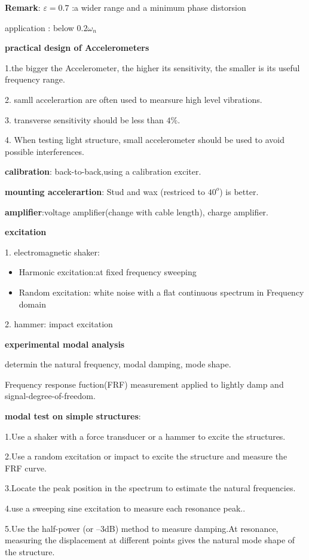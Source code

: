 \documentclass{article}
\begin{document}
\begin{multicols*}{3}
\textbf{Remark}:
$\varepsilon=0.7$ :a wider range and a minimum phase distorsion

application : below $0.2\omega_{n}$

\textbf{practical design of Accelerometers}

1.the bigger the Accelerometer, the higher its sensitivity, the smaller is its useful frequency range.

2. samll accelerartion are often used to mearsure high level vibrations.

3. transverse sensitivity should be less than $4\%$.

4. When testing light structure, small accelerometer should be used to avoid possible interferences.

\textbf{calibration}: back-to-back,using a calibration exciter.

\textbf{mounting accelerartion}: Stud and wax (restriced to $40^{o}$) is better.

\textbf{amplifier}:voltage amplifier(change with cable length), charge amplifier.

\textbf{excitation}

1. electromagnetic shaker:
\begin{itemize}
  \item Harmonic excitation:at fixed frequency sweeping
  \item Random excitation: white noise with  a flat continuous spectrum in Frequency domain
\end{itemize}

2. hammer: impact excitation

\noindent\textbf{experimental modal analysis}

determin the natural frequency, modal damping, mode shape.

Frequency response fuction(FRF) measurement applied to lightly damp and signal-degree-of-freedom.

\textbf{modal test on simple structures}:

1.Use a shaker with a force transducer or a hammer to excite the structures.

2.Use a random excitation or impact to excite the structure and measure the FRF curve.

3.Locate the peak position in the spectrum to estimate the natural frequencies.

4.use a sweeping sine excitation to measure each resonance peak..

5.Use the half-power (or –3dB) method to measure damping.At resonance, measuring the displacement at different points gives the natural mode shape of the structure.



\end{multicols*}
\end{document}
